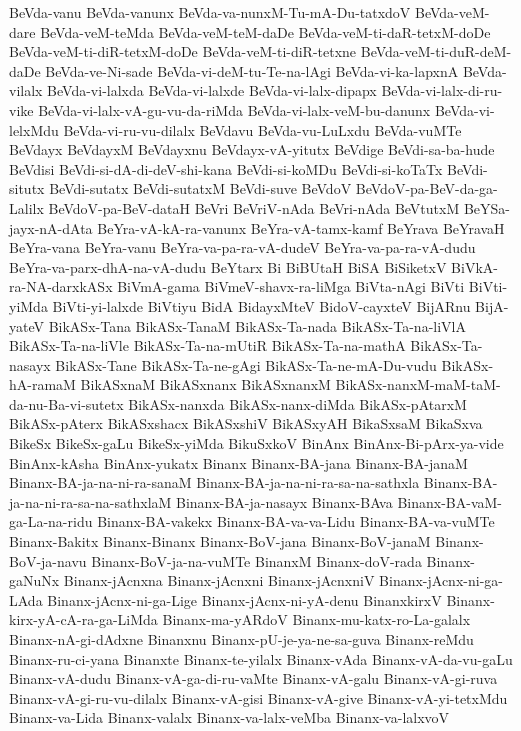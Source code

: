 {BeVda-vanu
BeVda-vanunx
BeVda-va-nunxM-Tu-mA-Du-tatxdoV
BeVda-veM-dare
BeVda-veM-teMda
BeVda-veM-teM-daDe
BeVda-veM-ti-daR-tetxM-doDe
BeVda-veM-ti-diR-tetxM-doDe
BeVda-veM-ti-diR-tetxne
BeVda-veM-ti-duR-deM-daDe
BeVda-ve-Ni-sade
BeVda-vi-deM-tu-Te-na-lAgi
BeVda-vi-ka-lapxnA
BeVda-vilalx
BeVda-vi-lalxda
BeVda-vi-lalxde
BeVda-vi-lalx-dipapx
BeVda-vi-lalx-di-ru-vike
BeVda-vi-lalx-vA-gu-vu-da-riMda
BeVda-vi-lalx-veM-bu-danunx
BeVda-vi-lelxMdu
BeVda-vi-ru-vu-dilalx
BeVdavu
BeVda-vu-LuLxdu
BeVda-vuMTe
BeVdayx
BeVdayxM
BeVdayxnu
BeVdayx-vA-yitutx
BeVdige
BeVdi-sa-ba-hude
BeVdisi
BeVdi-si-dA-di-deV-shi-kana
BeVdi-si-koMDu
BeVdi-si-koTaTx
BeVdi-situtx
BeVdi-sutatx
BeVdi-sutatxM
BeVdi-suve
BeVdoV
BeVdoV-pa-BeV-da-ga-Lalilx
BeVdoV-pa-BeV-dataH
BeVri
BeVriV-nAda
BeVri-nAda
BeVtutxM
BeYSa-jayx-nA-dAta
BeYra-vA-kA-ra-vanunx
BeYra-vA-tamx-kamf
BeYrava
BeYravaH
BeYra-vana
BeYra-vanu
BeYra-va-pa-ra-vA-dudeV
BeYra-va-pa-ra-vA-dudu
BeYra-va-parx-dhA-na-vA-dudu
BeYtarx
Bi
BiBUtaH
BiSA
BiSiketxV
BiVkA-ra-NA-darxkASx
BiVmA-gama
BiVmeV-shavx-ra-liMga
BiVta-nAgi
BiVti
BiVti-yiMda
BiVti-yi-lalxde
BiVtiyu
BidA
BidayxMteV
BidoV-cayxteV
BijARnu
BijA-yateV
BikASx-Tana
BikASx-TanaM
BikASx-Ta-nada
BikASx-Ta-na-liVlA
BikASx-Ta-na-liVle
BikASx-Ta-na-mUtiR
BikASx-Ta-na-mathA
BikASx-Ta-nasayx
BikASx-Tane
BikASx-Ta-ne-gAgi
BikASx-Ta-ne-mA-Du-vudu
BikASx-hA-ramaM
BikASxnaM
BikASxnanx
BikASxnanxM
BikASx-nanxM-maM-taM-da-nu-Ba-vi-sutetx
BikASx-nanxda
BikASx-nanx-diMda
BikASx-pAtarxM
BikASx-pAterx
BikASxshacx
BikASxshiV
BikASxyAH
BikaSxsaM
BikaSxva
BikeSx
BikeSx-gaLu
BikeSx-yiMda
BikuSxkoV
BinAnx
BinAnx-Bi-pArx-ya-vide
BinAnx-kAsha
BinAnx-yukatx
Binanx
Binanx-BA-jana
Binanx-BA-janaM
Binanx-BA-ja-na-ni-ra-sanaM
Binanx-BA-ja-na-ni-ra-sa-na-sathxla
Binanx-BA-ja-na-ni-ra-sa-na-sathxlaM
Binanx-BA-ja-nasayx
Binanx-BAva
Binanx-BA-vaM-ga-La-na-ridu
Binanx-BA-vakekx
Binanx-BA-va-va-Lidu
Binanx-BA-va-vuMTe
Binanx-Bakitx
Binanx-Binanx
Binanx-BoV-jana
Binanx-BoV-janaM
Binanx-BoV-ja-navu
Binanx-BoV-ja-na-vuMTe
BinanxM
Binanx-doV-rada
Binanx-gaNuNx
Binanx-jAcnxna
Binanx-jAcnxni
Binanx-jAcnxniV
Binanx-jAcnx-ni-ga-LAda
Binanx-jAcnx-ni-ga-Lige
Binanx-jAcnx-ni-yA-denu
BinanxkirxV
Binanx-kirx-yA-cA-ra-ga-LiMda
Binanx-ma-yARdoV
Binanx-mu-katx-ro-La-galalx
Binanx-nA-gi-dAdxne
Binanxnu
Binanx-pU-je-ya-ne-sa-guva
Binanx-reMdu
Binanx-ru-ci-yana
Binanxte
Binanx-te-yilalx
Binanx-vAda
Binanx-vA-da-vu-gaLu
Binanx-vA-dudu
Binanx-vA-ga-di-ru-vaMte
Binanx-vA-galu
Binanx-vA-gi-ruva
Binanx-vA-gi-ru-vu-dilalx
Binanx-vA-gisi
Binanx-vA-give
Binanx-vA-yi-tetxMdu
Binanx-va-Lida
Binanx-valalx
Binanx-va-lalx-veMba
Binanx-va-lalxvoV
}
